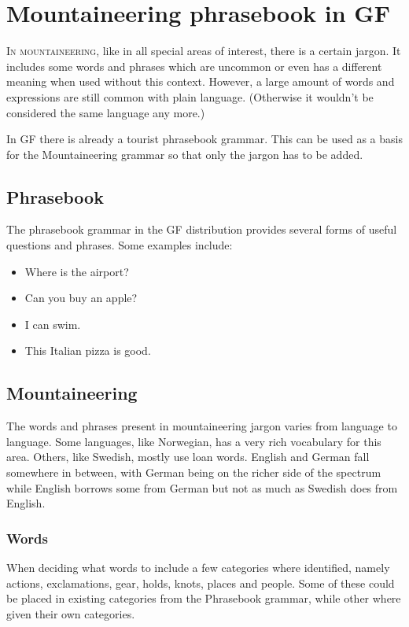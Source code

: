 \chapter{Mountaineering phrasebook in GF}
\lettrine[lines=4, loversize=-0.1, lraise=0.1]{I}{n mountaineering}, like in all special areas of interest, there is a certain jargon. It includes some words and phrases which are uncommon or even has a different meaning when used without this context. However, a large amount of words and expressions are still common with plain language. (Otherwise it wouldn't be considered the same language any more.)

In GF there is already a tourist phrasebook grammar. This can be used as a basis for the Mountaineering grammar so that only the jargon has to be added.

\section{Phrasebook}
The phrasebook grammar in the GF distribution provides several forms of useful questions and phrases. Some examples include:
\begin{itemize}
\item Where is the airport?
\item Can you buy an apple?
\item I can swim.
\item This Italian pizza is good.
\end{itemize}

\section{Mountaineering}
The words and phrases present in mountaineering jargon varies from language to language. Some languages, like Norwegian, has a very rich vocabulary for this area. Others, like Swedish, mostly use loan words. English and German fall somewhere in between, with German being on the richer side of the spectrum while English borrows some from German but not as much as Swedish does from English.

\subsection{Words}
When deciding what words to include a few categories where identified, namely actions, exclamations, gear, holds, knots, places and people. Some of these could be placed in existing categories from the Phrasebook grammar, while other where given their own categories.

